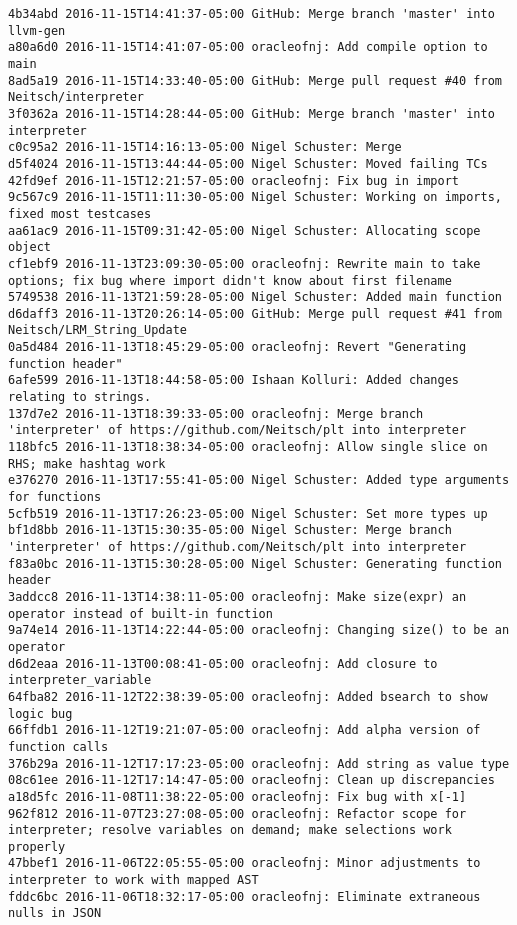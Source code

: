 \begin{lstlisting}
4b34abd 2016-11-15T14:41:37-05:00 GitHub: Merge branch 'master' into llvm-gen
a80a6d0 2016-11-15T14:41:07-05:00 oracleofnj: Add compile option to main
8ad5a19 2016-11-15T14:33:40-05:00 GitHub: Merge pull request #40 from Neitsch/interpreter
3f0362a 2016-11-15T14:28:44-05:00 GitHub: Merge branch 'master' into interpreter
c0c95a2 2016-11-15T14:16:13-05:00 Nigel Schuster: Merge
d5f4024 2016-11-15T13:44:44-05:00 Nigel Schuster: Moved failing TCs
42fd9ef 2016-11-15T12:21:57-05:00 oracleofnj: Fix bug in import
9c567c9 2016-11-15T11:11:30-05:00 Nigel Schuster: Working on imports, fixed most testcases
aa61ac9 2016-11-15T09:31:42-05:00 Nigel Schuster: Allocating scope object
cf1ebf9 2016-11-13T23:09:30-05:00 oracleofnj: Rewrite main to take options; fix bug where import didn't know about first filename
5749538 2016-11-13T21:59:28-05:00 Nigel Schuster: Added main function
d6daff3 2016-11-13T20:26:14-05:00 GitHub: Merge pull request #41 from Neitsch/LRM_String_Update
0a5d484 2016-11-13T18:45:29-05:00 oracleofnj: Revert "Generating function header"
6afe599 2016-11-13T18:44:58-05:00 Ishaan Kolluri: Added changes relating to strings.
137d7e2 2016-11-13T18:39:33-05:00 oracleofnj: Merge branch 'interpreter' of https://github.com/Neitsch/plt into interpreter
118bfc5 2016-11-13T18:38:34-05:00 oracleofnj: Allow single slice on RHS; make hashtag work
e376270 2016-11-13T17:55:41-05:00 Nigel Schuster: Added type arguments for functions
5cfb519 2016-11-13T17:26:23-05:00 Nigel Schuster: Set more types up
bf1d8bb 2016-11-13T15:30:35-05:00 Nigel Schuster: Merge branch 'interpreter' of https://github.com/Neitsch/plt into interpreter
f83a0bc 2016-11-13T15:30:28-05:00 Nigel Schuster: Generating function header
3addcc8 2016-11-13T14:38:11-05:00 oracleofnj: Make size(expr) an operator instead of built-in function
9a74e14 2016-11-13T14:22:44-05:00 oracleofnj: Changing size() to be an operator
d6d2eaa 2016-11-13T00:08:41-05:00 oracleofnj: Add closure to interpreter_variable
64fba82 2016-11-12T22:38:39-05:00 oracleofnj: Added bsearch to show logic bug
66ffdb1 2016-11-12T19:21:07-05:00 oracleofnj: Add alpha version of function calls
376b29a 2016-11-12T17:17:23-05:00 oracleofnj: Add string as value type
08c61ee 2016-11-12T17:14:47-05:00 oracleofnj: Clean up discrepancies
a18d5fc 2016-11-08T11:38:22-05:00 oracleofnj: Fix bug with x[-1]
962f812 2016-11-07T23:27:08-05:00 oracleofnj: Refactor scope for interpreter; resolve variables on demand; make selections work properly
47bbef1 2016-11-06T22:05:55-05:00 oracleofnj: Minor adjustments to interpreter to work with mapped AST
fddc6bc 2016-11-06T18:32:17-05:00 oracleofnj: Eliminate extraneous nulls in JSON

\end{lstlisting}
